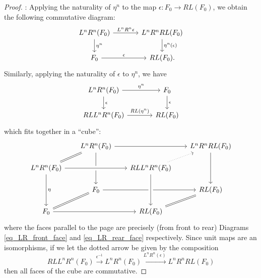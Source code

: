 \begin{proof}
 : Applying the naturality of
$\eta^n$ to the map $\epsilon: F_0 \to RL(F_0)$, we obtain the 
following commutative diagram:
\begin{equation}\label{eq_LR_rear_face}
\begin{tikzcd}[column sep=large]
L^nR^n(F_0) \arrow{r}{L^nR^n\epsilon} \arrow{d}{\eta^n} &
L^nR^nRL(F_0) \arrow{d}{\eta^n(\epsilon)} \\
F_0 \arrow{r}{\epsilon} &
RL(F_0).
\end{tikzcd}
\end{equation}
Similarly, applying the naturality of $\epsilon$ to $\eta^n$, we
have
\begin{equation}\label{eq_LR_front_face}
\begin{tikzcd}[column sep=large]
L^nR^n(F_0) \arrow{d}{\epsilon} \arrow{r}{\eta^n} &
F_0 \arrow{d}{\epsilon} \\
RLL^nR^n(F_0) \arrow{r}{RL(\eta^n)} &
RL(F_0)
\end{tikzcd}
\end{equation}
which fits together in a ``cube'':
\[
\begin{tikzcd}[row sep=scriptsize, column sep=scriptsize]
& L^nR^n(F_0) \arrow[equals]{dl}\arrow{rr}\arrow{dd}{\eta} & & 
   L^nR^nRL(F_0) \arrow{dd} \\
L^nR^n(F_0) \arrow[crossing over]{rr}\arrow{dd}{\eta} & & RLL^nR^n(F_0) 
   \arrow[dotted]{ur} \\
& F_0 \arrow[equals]{dl}\arrow{rr} & & RL(F_0) 
   \arrow[equals]{dl} \\
F_0 \arrow{rr} & & RL(F_0) \arrow[crossing over, leftarrow]{uu}
\end{tikzcd}
\]
where the faces parallel to the page are precisely (from front to
rear) Diagrams \ref{eq_LR_front_face} and \ref{eq_LR_rear_face}
respectively. Since unit maps are an isomorphisms, if we let the 
dotted arrow be given by the composition
\[
RLL^nR^n(F_0) \stackrel{\epsilon^{-1}}{\to} L^nR^n(F_0) 
\xrightarrow{L^nR^n(\epsilon)} L^nR^nRL(F_0)
\]
then all faces of the cube are commutative.


\end{proof}
